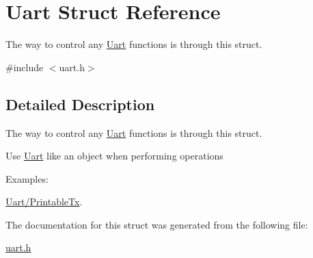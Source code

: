 \hypertarget{a00009}{\section{Uart Struct Reference}
\label{a00009}
}


The way to control any \hyperlink{a00009}{Uart} functions is through this struct.  




{\ttfamily \#include $<$uart.\-h$>$}



\subsection{Detailed Description}
The way to control any \hyperlink{a00009}{Uart} functions is through this struct. 

Use \hyperlink{a00009}{Uart} like an object when performing operations \begin{Desc}
\item[Examples\-: ]\par
\hyperlink{a00003}{Uart/\-Printable\-Tx}.\end{Desc}


The documentation for this struct was generated from the following file\-:\begin{DoxyCompactItemize}
\item 
\hyperlink{a00016}{uart.\-h}\end{DoxyCompactItemize}
